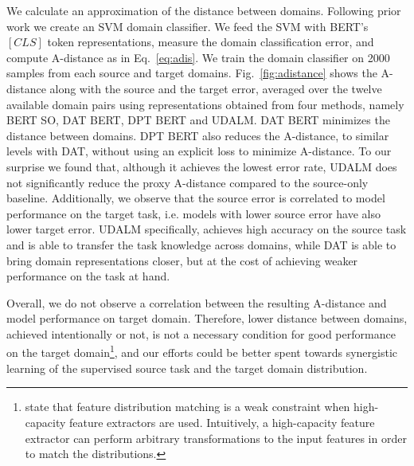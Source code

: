 \documentclass[11pt]{article}
\begin{document}
We calculate an approximation of the distance between domains. Following prior work \citep{ganin2016domain, saito2017asymmetric} we create an SVM domain classifier. 
We feed the SVM with BERT's \([CLS]\) token representations, measure the domain classification error, and compute A-distance as in Eq.~\ref{eq:adis}. 
We train the domain classifier on 2000 samples from each source and target domains. 
Fig.~\ref{fig:adistance} shows the A-distance along with the source and the target error, averaged over the twelve available domain pairs using representations obtained from four methods, namely BERT SO, DAT BERT, DPT BERT and UDALM.
DAT BERT minimizes the distance between domains.
DPT BERT also reduces the A-distance, to similar levels with DAT, without using an explicit loss to minimize A-distance.
To our surprise we found that, although it achieves the lowest error rate, UDALM does not significantly reduce the proxy A-distance compared to the source-only baseline.
Additionally, we observe that the source error is correlated to model performance on the target task, i.e. models with lower source error have also lower target error.
UDALM specifically, achieves high accuracy on the source task and is able to transfer the task knowledge across domains, while DAT is able to bring domain representations closer, but at the cost of achieving weaker performance on the task at hand.

Overall, we do not observe a correlation between the resulting A-distance and model performance on target domain.
Therefore, lower distance between domains, achieved intentionally or not, is not a necessary condition for good performance on the target domain\footnote{\citet{shu2018dirt} state that feature distribution matching is a weak constraint when high-capacity feature extractors are used. Intuitively, a high-capacity feature extractor can perform arbitrary transformations to the input features in order to match the distributions.}, and our efforts could be better spent towards synergistic learning of the supervised source task and the target domain distribution.
\end{document}
